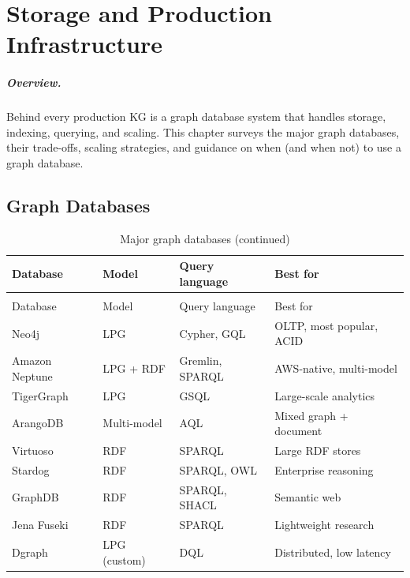 \documentclass[11pt,a4paper,oneside,openany]{book}
\theoremstyle{definition}
\theoremstyle{plain}
\theoremstyle{remark}
\begin{document}
\chapter{Storage and Production Infrastructure}\label{ch:storage}

\paragraph{Overview.}
Behind every production KG is a graph database system that handles storage, indexing, querying, and scaling. This chapter surveys the major graph databases, their trade-offs, scaling strategies, and guidance on when (and when not) to use a graph database.

\section{Graph Databases}\label{sec:graph-dbs}

\begin{longtable}{lp{3cm}p{3.5cm}p{4cm}}
	\caption{Major graph databases}
	\label{tab:graph-dbs}                                                      \\
	\toprule
	Database       & Model        & Query language  & Best for                 \\
	\midrule
	\endfirsthead
	\caption[]{Major graph databases (continued)}                              \\
	\toprule
	Database       & Model        & Query language  & Best for                 \\
	\midrule
	\endhead
	\bottomrule
	\endfoot
	Neo4j          & LPG          & Cypher, GQL     & OLTP, most popular, ACID \\
	Amazon Neptune & LPG + RDF    & Gremlin, SPARQL & AWS-native, multi-model  \\
	TigerGraph     & LPG          & GSQL            & Large-scale analytics    \\
	ArangoDB       & Multi-model  & AQL             & Mixed graph + document   \\
	Virtuoso       & RDF          & SPARQL          & Large RDF stores         \\
	Stardog        & RDF          & SPARQL, OWL     & Enterprise reasoning     \\
	GraphDB        & RDF          & SPARQL, SHACL   & Semantic web             \\
	Jena Fuseki    & RDF          & SPARQL          & Lightweight research     \\
	Dgraph         & LPG (custom) & DQL             & Distributed, low latency \\
\end{longtable}
\end{document}
